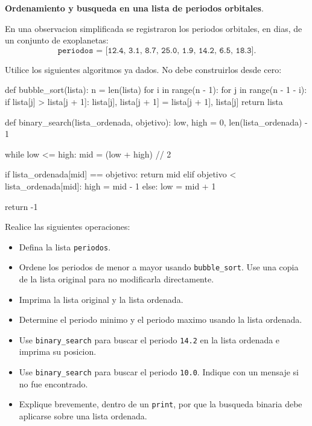 \item \textbf{Ordenamiento y busqueda en una lista de periodos orbitales}.
\nopagebreak[4]

\begin{tcolorbox}[colback=blue!2!white,colframe=blue!55!black,title={Enunciado},
                  before skip=3pt,after skip=5pt,boxsep=3pt,top=3pt,bottom=3pt,
                  breakable]
\small
\raggedright
En una observacion simplificada se registraron los periodos orbitales, en dias, de
un conjunto de exoplanetas:
\[
\texttt{periodos = [12.4,\ 3.1,\ 8.7,\ 25.0,\ 1.9,\ 14.2,\ 6.5,\ 18.3]}.
\]

Utilice los siguientes algoritmos ya dados. No debe construirlos desde cero:

\begin{pythonjupyter}
def bubble_sort(lista):
    n = len(lista)
    for i in range(n - 1):
        for j in range(n - 1 - i):
            if lista[j] > lista[j + 1]:
                lista[j], lista[j + 1] = lista[j + 1], lista[j]
    return lista

def binary_search(lista_ordenada, objetivo):
    low, high = 0, len(lista_ordenada) - 1

    while low <= high:
        mid = (low + high) // 2

        if lista_ordenada[mid] == objetivo:
            return mid
        elif objetivo < lista_ordenada[mid]:
            high = mid - 1
        else:
            low = mid + 1

    return -1
\end{pythonjupyter}

Realice las siguientes operaciones:

\begin{itemize}
\setlength{\topsep}{4pt}
\setlength{\itemsep}{3pt}
\setlength{\parsep}{0pt}
\item[(a)] Defina la lista \texttt{periodos}.
\item[(b)] Ordene los periodos de menor a mayor usando \texttt{bubble\_sort}. Use una copia de la lista original para no modificarla directamente.
\item[(c)] Imprima la lista original y la lista ordenada.
\item[(d)] Determine el periodo minimo y el periodo maximo usando la lista ordenada.
\item[(e)] Use \texttt{binary\_search} para buscar el periodo \texttt{14.2} en la lista ordenada e imprima su posicion.
\item[(f)] Use \texttt{binary\_search} para buscar el periodo \texttt{10.0}. Indique con un mensaje si no fue encontrado.
\item[(g)] Explique brevemente, dentro de un \texttt{print}, por que la busqueda binaria debe aplicarse sobre una lista ordenada.
\end{itemize}
\end{tcolorbox}


